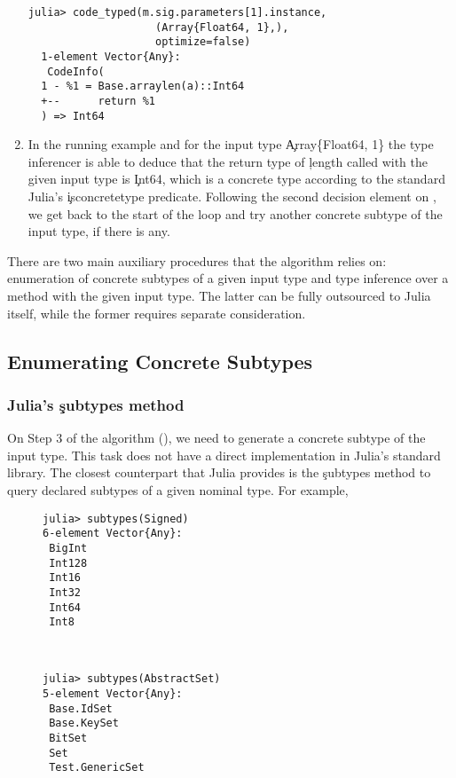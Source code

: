\begin{enumerate}
\begin{minipage}{.92\textwidth}
\begin{lstlisting}[style=jterm]
  julia> code_typed(m.sig.parameters[1].instance,
                    (Array{Float64, 1},),
                    optimize=false)
  1-element Vector{Any}:
   CodeInfo(
  1 - %1 = Base.arraylen(a)::Int64
  +--      return %1
  ) => Int64
\end{lstlisting}
\end{minipage}

  \item In the running example and for the input type \c{Array\{Float64, 1\}}
  the type inferencer is able to deduce that the return type of \c{length}
  called with the given input type is \c{Int64}, which is a concrete type
  according to the standard Julia's \c{isconcretetype} predicate.
  Following the second decision element on , we get back to
  the start of the loop and try another concrete subtype of the input type,
  if there is any.
\end{enumerate}

There are two main auxiliary procedures that the algorithm relies on: enumeration of
concrete subtypes of a given input type and type inference over a method with the
given input type. The latter can be fully outsourced to Julia itself, while the
former requires separate consideration.

\subsection{Enumerating Concrete Subtypes}%
\label{sec:approx:enu}

\subsubsection{Julia's \c{subtypes} method}

On Step 3 of the algorithm (), we need to generate a
concrete subtype of the input type. This task does not have a direct
implementation in Julia's standard library. The closest counterpart that Julia
provides is the \c{subtypes} method to query declared subtypes of a given
nominal type. For example,
\begin{figure}[h]
\begin{minipage}{.49\textwidth}
\begin{lstlisting}[style=jterm]
julia> subtypes(Signed)
6-element Vector{Any}:
 BigInt
 Int128
 Int16
 Int32
 Int64
 Int8
\end{lstlisting}
\end{minipage}
~
\begin{minipage}{.49\textwidth}
\begin{lstlisting}[style=jterm]
julia> subtypes(AbstractSet)
5-element Vector{Any}:
 Base.IdSet
 Base.KeySet
 BitSet
 Set
 Test.GenericSet

\end{lstlisting}
\end{minipage}
\end{figure}


